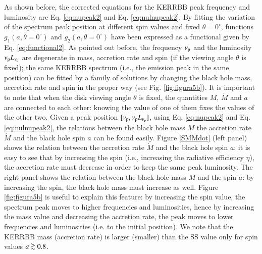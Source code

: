 \documentclass{aa}
\def\spose#1{\hbox to 0pt{#1\hss}}
\newcommand\gsim{\mathrel{\spose{\lower 3pt\hbox{$\mathchar"218$}}
     \raise 2.0pt\hbox{$\mathchar"13E$}}}
\begin{document}
As shown before, the corrected equations for the KERRBB peak frequency and luminosity are Eq. \eqref{eq:nupeak2} and Eq. \eqref{eq:nulnupeak2}. By fitting the variation of the spectrum peak position at different spin values and fixed $\theta = 0^{\circ}$, functions $g_1(a, \theta=0^{\circ})$ and $g_2(a, \theta=0^{\circ})$ have been expressed as a functional given by Eq. \eqref{eq:functional2}. As pointed out before, the frequency $\nu_{\rm p}$ and the luminosity $\nu_{\rm p} L_{\nu_{\rm p}}$ are degenerate in mass, accretion rate and spin (if the viewing angle $\theta$ is fixed); the same KERRBB spectrum (i.e., the emission peak in the same position) can be fitted by a family of solutions by changing the black hole mass, accretion rate and spin in the proper way (see Fig. \ref{fig:figura5b}). It is important to note that when the disk viewing angle $\theta$ is fixed, the quantities $M$, $\dot{M}$ and $a$ are connected to each other: knowing the value of one of them fixes the values of the other two. Given a peak position $[\nu_{\rm p}, \nu_{\rm p} L_{\nu_{\rm p}}]$, using Eq. \eqref{eq:nupeak2} and Eq. \eqref{eq:nulnupeak2}, the relations between the black hole mass $M$ the accretion rate $\dot{M}$ and the black hole spin $a$ can be found easily. 
Figure \ref{SMMdot} (left panel) shows the relation between the accretion rate $\dot{M}$ and the black hole spin $a$: it is easy to see that by increasing the spin (i.e., increasing the radiative efficiency $\eta$), the accretion rate must decrease in order to keep the same peak luminosity. The right panel shows the relation between the black hole mass $M$ and the spin $a$: by increasing the spin, the black hole mass must increase as well. Figure \ref{fig:figura5b} is useful to explain this feature: by increasing the spin value, the spectrum peak moves to higher frequencies and luminosities, hence by increasing the mass value and decreasing the accretion rate, the peak moves to lower frequencies and luminosities (i.e. to the initial position). We note that the KERRBB mass (accretion rate) is larger (smaller) than the SS value only for spin values $a \gsim 0.8$. 






\label{lastpage}
\endgroup
\end{document}
